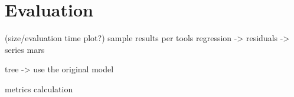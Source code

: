 
\chapter{Evaluation}
(size/evaluation time plot?)
sample results per tools
	regression -> residuals -> series
	mars

tree -> use the original model

metrics calculation